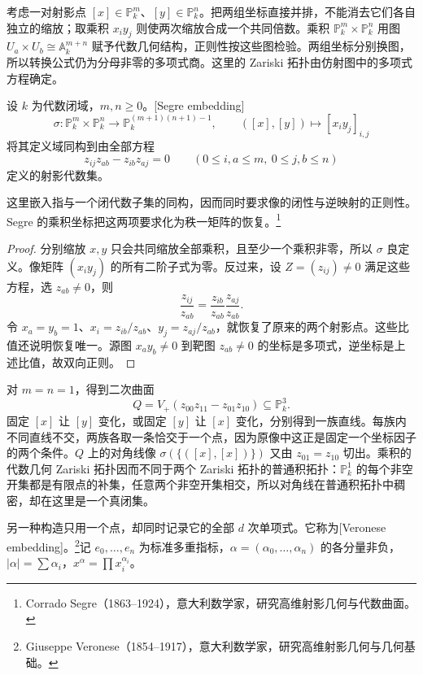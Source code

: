 考虑一对射影点 \([x]\in\mathbb P^m_k\)、\([y]\in\mathbb P^n_k\)。把两组坐标直接并排，不能消去它们各自独立的缩放；取乘积 \(x_i y_j\) 则使两次缩放合成一个共同倍数。乘积 \(\mathbb P^m_k\times\mathbb P^n_k\) 用图 \(U_a\times U_b\cong\mathbb A^{m+n}_k\) 赋予代数几何结构，正则性按这些图检验。两组坐标分别换图，所以转换公式仍为分母非零的多项式商。这里的 Zariski 拓扑由仿射图中的多项式方程确定。

\begin{proposition}
\label{g5:prop:segre-embedding}
	设 \(k\) 为代数闭域，\(m,n\geq0\)。[Segre embedding]
	\[
		\sigma:\mathbb P^m_k\times\mathbb P^n_k\longrightarrow\mathbb P^{(m+1)(n+1)-1}_k,
		\qquad([x],[y])\longmapsto[x_i y_j]_{i,j}
	\]
	将其定义域同构到由全部方程
	\[
		z_{ij}z_{ab}-z_{ib}z_{aj}=0
		\qquad(0\leq i,a\leq m,\ 0\leq j,b\leq n)
	\]
	定义的射影代数集。
\end{proposition}

这里嵌入指与一个闭代数子集的同构，因而同时要求像的闭性与逆映射的正则性。Segre 的乘积坐标把这两项要求化为秩一矩阵的恢复。\footnote{Corrado Segre（1863--1924），意大利数学家，研究高维射影几何与代数曲面。}

\begin{proof}
	分别缩放 \(x,y\) 只会共同缩放全部乘积，且至少一个乘积非零，所以 \(\sigma\) 良定义。像矩阵 \((x_i y_j)\) 的所有二阶子式为零。反过来，设 \(Z=(z_{ij})\ne0\) 满足这些方程，选 \(z_{ab}\ne0\)，则
	\[
		\frac{z_{ij}}{z_{ab}}
		=\frac{z_{ib}}{z_{ab}}\frac{z_{aj}}{z_{ab}}.
	\]
	令 \(x_a=y_b=1\)、\(x_i=z_{ib}/z_{ab}\)、\(y_j=z_{aj}/z_{ab}\)，就恢复了原来的两个射影点。这些比值还说明恢复唯一。源图 \(x_a y_b\ne0\) 到靶图 \(z_{ab}\ne0\) 的坐标是多项式，逆坐标是上述比值，故双向正则。
\end{proof}

对 \(m=n=1\)，得到二次曲面
\[
	Q=V_+(z_{00}z_{11}-z_{01}z_{10})\subseteq\mathbb P^3_k.
\]
固定 \([x]\) 让 \([y]\) 变化，或固定 \([y]\) 让 \([x]\) 变化，分别得到一族直线。每族内不同直线不交，两族各取一条恰交于一个点，因为原像中这正是固定一个坐标因子的两个条件。\(Q\) 上的对角线像 \(\sigma(\{([x],[x])\})\) 又由 \(z_{01}=z_{10}\) 切出。乘积的代数几何 Zariski 拓扑因而不同于两个 Zariski 拓扑的普通积拓扑：\(\mathbb P^1_k\) 的每个非空开集都是有限点的补集，任意两个非空开集相交，所以对角线在普通积拓扑中稠密，却在这里是一个真闭集。

另一种构造只用一个点，却同时记录它的全部 \(d\) 次单项式。它称为[Veronese embedding]。\footnote{Giuseppe Veronese（1854--1917），意大利数学家，研究高维射影几何与几何基础。}记 \(e_0,\ldots,e_n\) 为标准多重指标，\(\alpha=(\alpha_0,\ldots,\alpha_n)\) 的各分量非负，\(|\alpha|=\sum\alpha_i\)，\(x^\alpha=\prod x_i^{\alpha_i}\)。

